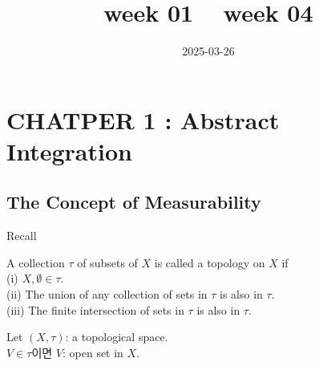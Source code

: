 \documentclass[11pt]{article}
\renewcommand{\(}{\left(}
\renewcommand{\)}{\right)}
\renewcommand{\[}{\left[}
\renewcommand{\]}{\right]}
\newcommand{\tags}[1]{#1}
\newenvironment{text-box}{}{}
\newcommand{\subheading}[1]{#1}
\begin{document}
\title{week 01 ~ week 04}
\date{2025-03-26}
\tags{}

\maketitle

\section{CHATPER 1 : Abstract Integration}

\subsection{The Concept of Measurability}

\subheading{Recall}

\begin{text-box}
    A collection $\tau$ of subsets of $X$ is called a topology on $X$ if \\
    (i) $X, \emptyset \in \tau$. \\
    (ii) The union of any collection of sets in $\tau$ is also in $\tau$. \\
    (iii) The finite intersection of sets in $\tau$ is also in $\tau$.
\end{text-box}

\begin{text-box}
    Let $(X, \tau)$: a topological space. \\
    $V \in \tau$이면 $V$: open set in $X$.    
\end{text-box}
\end{document}
